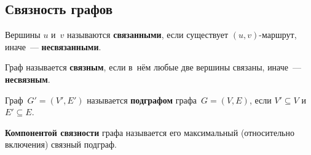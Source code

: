 \subsection{Связность графов}
Вершины $u$ и~$v$ называются \textbf{связанными}, если существует $(u, v)$-маршрут, иначе~--- \textbf{несвязанными}.

Граф называется \textbf{связным}, если в~нём любые две вершины связаны, иначе~--- \textbf{несвязным}.

Граф~$G' = (V', E')$ называется \textbf{подграфом} графа~$G = (V, E)$, если $V' \subseteq V$ и~$E' \subseteq E$.

\textbf{Компонентой связности} графа называется его максимальный (относительно включения) связный подграф.